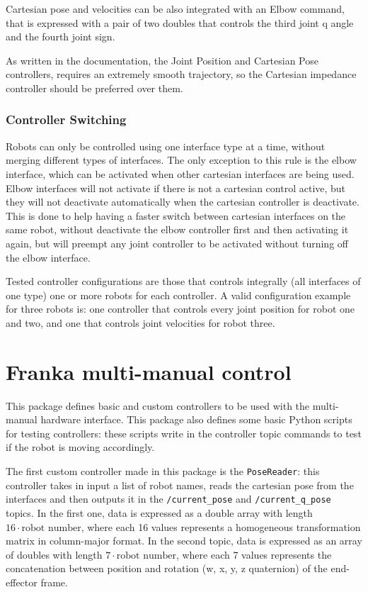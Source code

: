 \documentclass{article}
\begin{document}
Cartesian pose and velocities can be also integrated with an Elbow command, that is expressed with a pair of two doubles that controls the third joint q angle and the fourth joint sign.

As written in the documentation, the Joint Position and Cartesian Pose controllers, requires an extremely smooth trajectory, so the Cartesian impedance controller should be preferred over them.

\subsubsection{Controller Switching}
Robots can only be controlled using one interface type at a time, without merging different types of interfaces. The only exception to this rule is the elbow interface, which can be activated when other cartesian interfaces are being used. Elbow interfaces will not activate if there is not a cartesian control active, but they will not deactivate automatically when the cartesian controller is deactivate. This is done to help having a faster switch between cartesian interfaces on the same robot, without deactivate the elbow controller first and then activating it again, but will preempt any joint controller to be activated without turning off the elbow interface.

Tested controller configurations are those that controls integrally (all interfaces of one type) one or more robots for each controller.
A valid configuration example for three robots is: one controller that controls every joint position for robot one and two, and one that controls joint velocities for robot three.

\section{Franka multi-manual control}

This package defines basic and custom controllers to be used with the multi-manual hardware interface. This package also defines some basic Python scripts for testing controllers: these scripts write in the controller topic commands to test if the robot is moving accordingly. 

The first custom controller made in this package is the \texttt{PoseReader}: this controller takes in input a list of robot names, reads the cartesian pose from the interfaces and then outputs it in the \texttt{/current\_pose} and \texttt{/current\_q\_pose} topics. In the first one, data is expressed as a double array with length $16 \cdot \text{robot number}$, where each 16 values represents a homogeneous transformation matrix in column-major format. In the second topic, data is expressed as an array of doubles with length $7 \cdot \text{robot number}$, where each 7 values represents the concatenation between position and rotation (w, x, y, z quaternion) of the end-effector frame.  
\end{document}
